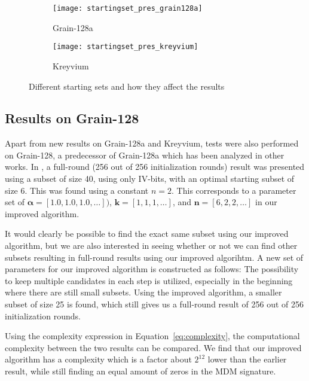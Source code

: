 {\begin{figure}[htbp]
	\centering
	\begin{subfigure}[b]{0.5\textwidth}
		\texttt{[image: startingset\_pres\_grain128a]}
		\captionsetup{singlelinecheck=true}
		\caption{Grain-128a}
		\label{fig:startingsetgrain128a}
	\end{subfigure}%
	\begin{subfigure}[b]{0.5\textwidth}
		\texttt{[image: startingset\_pres\_kreyvium]}
		\captionsetup{singlelinecheck=true}
		\caption{Kreyvium}
		\label{fig:startingsetkreyvium}
	\end{subfigure}
	
	\caption{Different starting sets and how they affect the results}
	\label{fig:startingset}
\end{figure}

\subsection{Results on Grain-128}

Apart from new results on Grain-128a and Kreyvium, tests were also performed on Grain-128, a predecessor of Grain-128a which has been analyzed in other works. In \cite{stankovski:2010}, a full-round (256 out of 256 initialization rounds) result was presented using a subset of size 40, using only IV-bits, with an optimal starting subset of size 6. This was found using a constant $n=2$. This corresponds to a parameter set of $\bm{\alpha} = [1.0, 1.0, 1.0, \ldots])$, $\bm{k} = [1, 1, 1, \ldots]$, and $\bm{n} = [6, 2, 2, \ldots]$ in our improved algorithm.

It would clearly be possible to find the exact same subset using our improved algorithm, but we are also interested in seeing whether or not we can find other subsets resulting in full-round results using our improved algorihtm.
A new set of parameters for our improved algorithm is constructed as follows:
The possibility to keep multiple candidates in each step is utilized, especially in the beginning where there are still small subsets. Using the improved algorithm, a smaller subset of size 25 is found, which still gives us a full-round result of 256 out of 256 initialization rounds.

Using the complexity expression in Equation~\ref{eq:complexity}, the computational complexity between the two results can be compared. We find that our improved algorithm has a complexity which is a factor about $2^{12}$ lower than the earlier result, while still finding an equal amount of zeros in the MDM signature.

}
